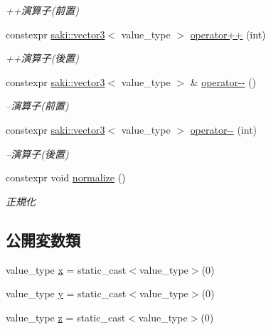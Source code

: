 \begin{DoxyCompactItemize}
\begin{DoxyCompactList}\small\item\em ++演算子(前置) \end{DoxyCompactList}\item 
constexpr \mbox{\hyperlink{classsaki_1_1vector3}{saki\+::vector3}}$<$ value\+\_\+type $>$ \mbox{\hyperlink{classsaki_1_1vector3_a2310ac18d9b37a8ab6d967bfd9720998}{operator++}} (int)
\begin{DoxyCompactList}\small\item\em ++演算子(後置) \end{DoxyCompactList}\item 
constexpr \mbox{\hyperlink{classsaki_1_1vector3}{saki\+::vector3}}$<$ value\+\_\+type $>$ \& \mbox{\hyperlink{classsaki_1_1vector3_ae72c214f2b976854cc8f87009eb34956}{operator-\/-\/}} ()
\begin{DoxyCompactList}\small\item\em --演算子(前置) \end{DoxyCompactList}\item 
constexpr \mbox{\hyperlink{classsaki_1_1vector3}{saki\+::vector3}}$<$ value\+\_\+type $>$ \mbox{\hyperlink{classsaki_1_1vector3_a9b3a81278ca27fc7fc43417c47cb80a4}{operator-\/-\/}} (int)
\begin{DoxyCompactList}\small\item\em --演算子(後置) \end{DoxyCompactList}\item 
constexpr void \mbox{\hyperlink{classsaki_1_1vector3_af99372de14e9ddba3eba28327c555930}{normalize}} ()
\begin{DoxyCompactList}\small\item\em 正規化 \end{DoxyCompactList}\end{DoxyCompactItemize}
\subsection*{公開変数類}
\begin{DoxyCompactItemize}
\item 
value\+\_\+type \mbox{\hyperlink{classsaki_1_1vector3_af3c83fc9c183501a5cfd42f33cac21df}{x}} = static\+\_\+cast$<$value\+\_\+type$>$(0)
\item 
value\+\_\+type \mbox{\hyperlink{classsaki_1_1vector3_a5ecb4148ebb05a45be8371459a57b1b2}{y}} = static\+\_\+cast$<$value\+\_\+type$>$(0)
\item 
value\+\_\+type \mbox{\hyperlink{classsaki_1_1vector3_a910df22d3a9c3a2da377756454f3b645}{z}} = static\+\_\+cast$<$value\+\_\+type$>$(0)
\end{DoxyCompactItemize}


